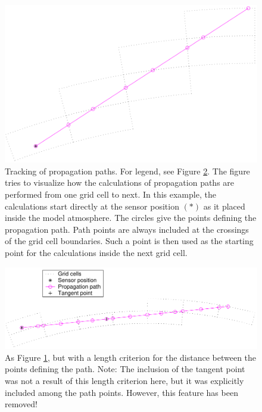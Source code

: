 \begin{figure}
 \begin{center}
  \includegraphics*[width=0.80\hsize]{ppath_ex1}
  \caption{Tracking of propagation paths. For legend, see 
    Figure \ref{fig:ppath:ex2}. The figure tries to visualize how the
    calculations of propagation paths are performed from one grid cell
    to next. In this example, the calculations start directly at the
    sensor position $(\ast)$ as it placed inside the model
    atmosphere. The circles give the points defining the propagation
    path. Path points are always included at the crossings of the grid
    cell boundaries. Such a point is then used as the starting point
    for the calculations inside the next grid cell. }
  \label{fig:ppath:ex1}  
 \end{center}
\end{figure}

\begin{figure}
 \begin{center}
   \includegraphics*[width=0.98\hsize]{ppath_ex2}
  \caption{As Figure \ref{fig:ppath:ex1}, but with a length criterion 
    for the distance between the points defining the path.
    Note: The inclusion of the tangent point was not a result of this length
    criterion here, but it was explicitly included among the path points.
    However, this feature has been removed!}
  \label{fig:ppath:ex2}  
 \end{center}
\end{figure}


